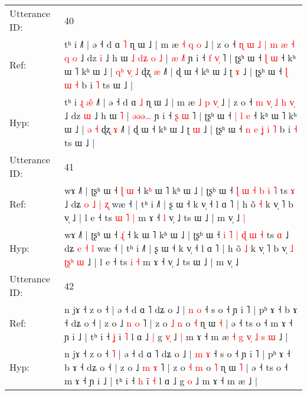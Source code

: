 \documentclass[10pt]{article}
\DeclareRobustCommand{\hl}[1]{{\textcolor{red}{#1}}}
\begin{document}
\begin{longtable}{ll}
 \\
\midrule
Utterance ID: & 40 \\
Ref: & tʰ i\hl{}\hl{}\hl{}\hl{}\hl{} ˩˥ | ə ˧ d ɑ \hl{˥} ɳ ɯ ˩ | m æ \hl{˧} \hl{q} \hl{}\hl{o} ˩ | z o ˧\hl{ }\hl{ɳ}\hl{ }\hl{ɯ} \hl{˩} \hl{|}\hl{ }\hl{m} \hl{æ} \hl{˧} \hl{q}\hl{ }\hl{o} ˩ dz \hl{i} ˩ h ɯ\hl{ }\hl{˩}\hl{ }\hl{d}\hl{ʑ}\hl{ }\hl{o} \hl{˩} | \hl{æ}\hl{ }\hl{˩}\hl{˥} ɲ i ˧ \hl{f} \hl{v}\hl{̩} ˥ | ʈʂʰ ɯ ˧\hl{}\hl{} \hl{ɭ} \hl{ɯ} ˧ kʰ ɯ ˥ kʰ ɯ ˩ |\hl{ }\hl{q}\hl{ʰ} \hl{v}\hl{̩} \hl{˩} ɖʐ \hl{æ} ˩˥ | ɖ ɯ ˧ kʰ ɯ ˩ ʈ \hl{ɤ} ˩ | ʈʂʰ ɯ ˧\hl{}\hl{}\hl{}\hl{} \hl{ɭ} \hl{ɯ} \hl{˧} b i \hl{˥} ts ɯ ˩ |
 \\
Hyp: & tʰ i\hl{ }\hl{ɻ}\hl{ }\hl{æ}\hl{̃} ˩˥ | ə ˧ d ɑ \hl{˩} ɳ ɯ ˩ | m æ \hl{˩} \hl{p} \hl{v}\hl{̩} ˩ | z o ˧\hl{}\hl{}\hl{}\hl{} \hl{m} \hl{}\hl{v}\hl{̩} \hl{˩} \hl{h} \hl{}\hl{v}\hl{̩} ˩ dz \hl{ɯ} ˩ h ɯ\hl{}\hl{}\hl{}\hl{}\hl{}\hl{}\hl{} \hl{˥} | \hl{ə}\hl{ə}\hl{ə}\hl{…} ɲ i ˧ \hl{ʂ} \hl{}\hl{ɯ} ˥ | ʈʂʰ ɯ ˧\hl{ }\hl{|} \hl{l} \hl{e} ˧ kʰ ɯ ˥ kʰ ɯ ˩ |\hl{}\hl{}\hl{} \hl{}\hl{ə} \hl{˧} ɖʐ \hl{ɤ} ˩˥ | ɖ ɯ ˧ kʰ ɯ ˩ ʈ \hl{ɯ} ˩ | ʈʂʰ ɯ ˧\hl{ }\hl{n}\hl{ }\hl{e} \hl{ʝ} \hl{i} \hl{˥} b i \hl{˧} ts ɯ ˩ |
 \\
\midrule
Utterance ID: & 41 \\
Ref: & wɤ ˩˥ | ʈʂʰ ɯ ˧ \hl{ɭ}\hl{ }\hl{ɯ} ˧ k\hl{ʰ} ɯ ˥ kʰ ɯ ˩ | ʈʂʰ ɯ ˧ \hl{ɭ} \hl{ɯ} \hl{˧} \hl{b} \hl{i} \hl{˥} ts \hl{ɤ} ˩ dʑ\hl{ }\hl{o} \hl{˩} \hl{|} \hl{ʐ} wæ ˧ | tʰ i ˩˥ | ʂ ɯ ˧ k v̩ ˧ l ɑ ˥ | h õ \hl{˧} k v̩ ˥ b v̩\hl{}\hl{}\hl{}\hl{}\hl{}\hl{}\hl{}\hl{} ˩ | l e ˧ ts\hl{ }\hl{ɯ} \hl{˥} \hl{|} m ɤ ˧\hl{ }\hl{l} v̩ ˩ ts ɯ ˩ | m v̩ ˩\hl{ }\hl{|}
 \\
Hyp: & wɤ ˩˥ | ʈʂʰ ɯ ˧ \hl{}\hl{ɻ}\hl{̍} ˧ k\hl{} ɯ ˥ kʰ ɯ ˩ | ʈʂʰ ɯ ˧ \hl{i} \hl{˥} \hl{|} \hl{ɖ} \hl{ɯ} \hl{˧} ts \hl{ɑ} ˩ dʑ\hl{}\hl{} \hl{e} \hl{˧} \hl{l} wæ ˧ | tʰ i ˩˥ | ʂ ɯ ˧ k v̩ ˧ l ɑ ˥ | h õ \hl{˩} k v̩ ˥ b v̩\hl{ }\hl{˩}\hl{ }\hl{ʈ}\hl{ʂ}\hl{ʰ}\hl{ }\hl{ɯ} ˩ | l e ˧ ts\hl{}\hl{} \hl{i} \hl{˧} m ɤ ˧\hl{}\hl{} v̩ ˩ ts ɯ ˩ | m v̩ ˩\hl{}\hl{}
 \\
\midrule
Utterance ID: & 42 \\
Ref: & n jɤ ˧ z o ˧\hl{}\hl{} | ə ˧ d ɑ ˥ dʑ o ˩ | \hl{n} \hl{o} ˧ s o ˧ ɲ i ˥ | pʰ ɤ ˧ b ɤ ˧ dʑ o ˧ | z o ˩ \hl{n} \hl{o} ˥ | z o \hl{˩} \hl{n} o \hl{˧} ɳ ɯ \hl{˧} | ə ˧ ts o ˧ m ɤ ˧ ɲ i ˩ | tʰ i ˧ \hl{ʝ} i\hl{} \hl{˥} l ɑ ˩\hl{ }\hl{|} g \hl{v}\hl{̩} ˩\hl{ }\hl{|} m ɤ ˧ m æ\hl{ }\hl{˧}\hl{ }\hl{g}\hl{ }\hl{v}\hl{̩}\hl{ }\hl{˩}\hl{ }\hl{s}\hl{ }\hl{ɯ} ˩ |
 \\
Hyp: & n jɤ ˧ z o ˧\hl{ }\hl{˥} | ə ˧ d ɑ ˥ dʑ o ˩ | \hl{m} \hl{ɤ} ˧ s o ˧ ɲ i ˥ | pʰ ɤ ˧ b ɤ ˧ dʑ o ˧ | z o ˩ \hl{m} \hl{ɤ} ˥ | z o \hl{˧} \hl{m} o \hl{˥} ɳ ɯ \hl{˥} | ə ˧ ts o ˧ m ɤ ˧ ɲ i ˩ | tʰ i ˧ \hl{h} i\hl{̃} \hl{˧} l ɑ ˩\hl{}\hl{} g \hl{}\hl{o} ˩\hl{}\hl{} m ɤ ˧ m æ\hl{}\hl{}\hl{}\hl{}\hl{}\hl{}\hl{}\hl{}\hl{}\hl{}\hl{}\hl{}\hl{} ˩ |

\end{longtable}
\end{document}
